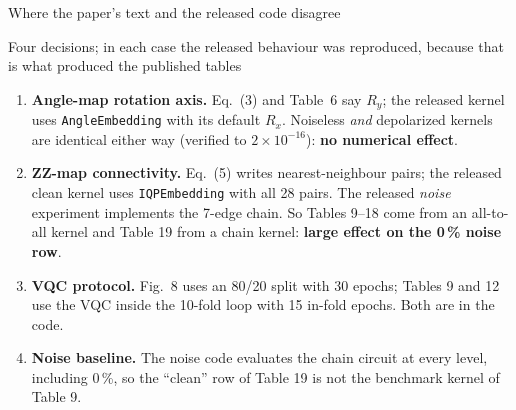 \documentclass[aspectratio=169,10pt,t,xcolor={table}]{beamer}
\newcommand{\ok}[1]{\textcolor{qgreen}{\textbf{#1}}}
\newcommand{\warn}[1]{\textcolor{qamber}{\textbf{#1}}}
\newcommand{\code}[1]{\texttt{\small #1}}
\begin{document}
\begin{frame}{Where the paper's text and the released code disagree}
\begin{block}{Four decisions; in each case the released behaviour was reproduced, because that is what produced the published tables}
\begin{enumerate}\footnotesize
  \item \textbf{Angle-map rotation axis.} Eq.~(3) and Table~6 say $R_y$; the released kernel uses \code{AngleEmbedding} with its default $R_x$. Noiseless \emph{and} depolarized kernels are identical either way (verified to $2\times10^{-16}$): \ok{no numerical effect}.
  \item \textbf{ZZ-map connectivity.} Eq.~(5) writes nearest-neighbour pairs; the released clean kernel uses \code{IQPEmbedding} with all 28 pairs. The released \emph{noise} experiment implements the 7-edge chain. So Tables 9--18 come from an all-to-all kernel and Table 19 from a chain kernel: \warn{large effect on the 0\,\% noise row}.
  \item \textbf{VQC protocol.} Fig.~8 uses an 80/20 split with 30 epochs; Tables 9 and 12 use the VQC inside the 10-fold loop with 15 in-fold epochs. Both are in the code.
  \item \textbf{Noise baseline.} The noise code evaluates the chain circuit at every level, including 0\,\%, so the ``clean'' row of Table 19 is not the benchmark kernel of Table 9.
\end{enumerate}
\end{block}
\end{frame}
\end{document}
